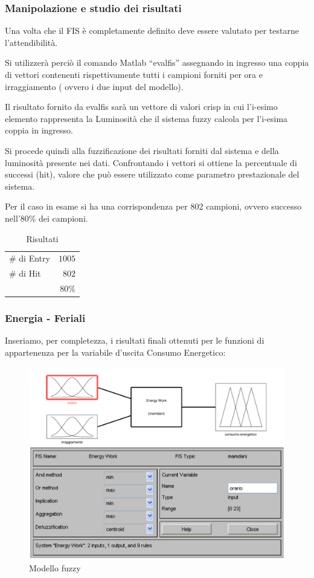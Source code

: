 \subsubsection{Manipolazione e studio dei risultati}
Una volta che il FIS è completamente definito deve essere valutato per testarne l'attendibilità.

Si utilizzerà perciò il comando Matlab “evalfis” assegnando in ingresso una coppia di vettori contenenti rispettivamente tutti i campioni forniti per ora e irraggiamento ( ovvero i due input del modello).

Il risultato fornito da evalfis sarà un vettore di valori crisp in cui l'i-esimo elemento rappresenta la Luminosità che il sistema fuzzy calcola per l'i-esima coppia in ingresso.

Si procede quindi alla fuzzificazione dei risultati forniti dal sistema e della luminosità presente nei dati. Confrontando i vettori si ottiene la percentuale di successi (hit), valore che può essere utilizzato come parametro prestazionale del sistema.

Per il caso in esame si ha una corrispondenza per 802 campioni, ovvero successo nell'80\% dei campioni.
\begin{table}
  \caption{Risultati}
  \centering
	\begin{tabular}{lr}
		\toprule
      \# di Entry & $1005$ \\
			\# di Hit   & $802$ \\
		\midrule
			& $80\%$ \\
		\bottomrule
	\end{tabular}
\end{table}


\subsubsection{Energia - Feriali}
Inseriamo, per completezza, i risultati finali ottenuti per le funzioni di appartenenza per la variabile d'uscita Consumo Energetico:
\begin{figure}[htbp]
  \centering
  \includegraphics[scale=0.5]{images/fuzzy/modello_fuzzy.pdf}
  \caption{Modello fuzzy}
\end{figure}

